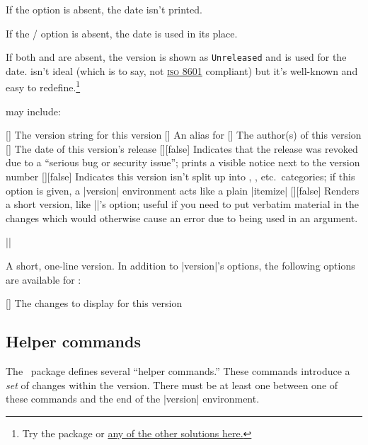 \documentclass{ltxguidex}
\newcommand{\cl}{\ctan{changelog}}
\begin{document}
If the  option is absent, the date isn't printed.

If the / option is absent, the date is used in its
place.

If both  and  are absent, the version is shown
as \texttt{Unreleased} and  is used for the date.  isn't
ideal (which is to say, not
\href{https://en.wikipedia.org/wiki/ISO_8601}{\textsc{iso} 8601} compliant)
but it's well-known and easy to redefine.\footnote{Try the 
package or
\href{https://tex.stackexchange.com/questions/152392/date-format-yyyy-mm-dd}{any
of the other solutions here.}}

 may include:

\begin{keys}
	[]
		The version string for this version
	[]
		An alias for 
	[]
		The author(s) of this version
	[]
		The date of this version's release
	[\bool][false]
		Indicates that the release was revoked due to a ``serious bug or
		security issue''; prints a visible notice next to the version number
	[\bool][false]
		Indicates this version isn't split up into , ,
		etc.\ categories; if this option is given, a |version| environment acts
		like a plain |itemize|
	[\bool][false]
		Renders a short version, like |\shortversion|'s  option;
		useful if you need to put verbatim material in the changes which would
		otherwise cause an error due to being used in an argument.
\end{keys}

\begin{desc}
||
\end{desc}
A short, one-line version. In addition to |version|'s options, the following
options are available for :

\begin{keys}
	[] The changes to display for this version
\end{keys}

\subsection{Helper commands}

The \cl\ package defines several ``helper commands.'' These commands
introduce a \textit{set} of changes within the version. There must be at
least one  between one of these commands and the end of the
|version| environment.
\end{document}
